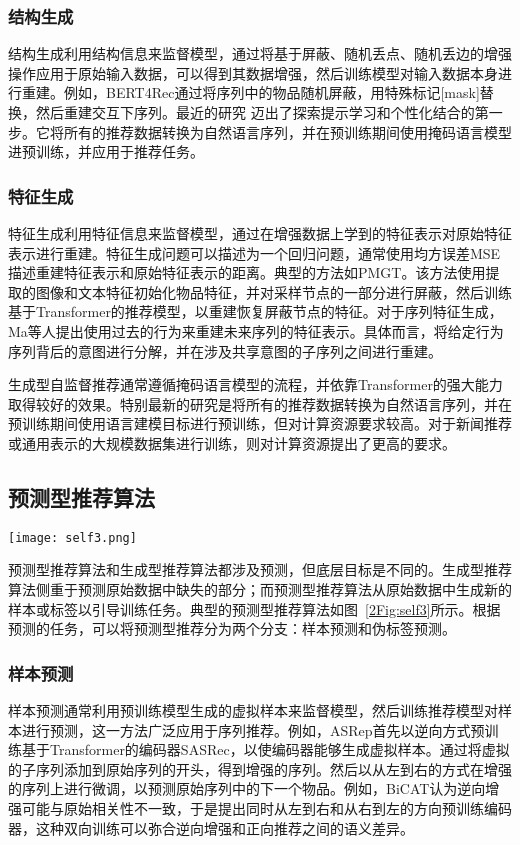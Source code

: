 \subsubsection{结构生成}
结构生成利用结构信息来监督模型，通过将基于屏蔽、随机丢点、随机丢边的增强操作应用于原始输入数据，可以得到其数据增强，然后训练模型对输入数据本身进行重建。例如，BERT4Rec\cite{sun2019bert4rec}通过将序列中的物品随机屏蔽，用特殊标记[mask]替换，然后重建交互下序列。最近的研究 \cite{geng2022recommendation,zhang:sigir} 迈出了探索提示学习和个性化结合的第一步。它将所有的推荐数据转换为自然语言序列，并在预训练期间使用掩码语言模型进预训练，并应用于推荐任务。
\subsubsection{特征生成}
特征生成利用特征信息来监督模型，通过在增强数据上学到的特征表示对原始特征表示进行重建。特征生成问题可以描述为一个回归问题，通常使用均方误差MSE描述重建特征表示和原始特征表示的距离。典型的方法如PMGT\cite{liu2021pre}。该方法使用提取的图像和文本特征初始化物品特征，并对采样节点的一部分进行屏蔽，然后训练基于Transformer的推荐模型，以重建恢复屏蔽节点的特征。对于序列特征生成，Ma等人\cite{ma2020disentangled}提出使用过去的行为来重建未来序列的特征表示。具体而言，将给定行为序列背后的意图进行分解，并在涉及共享意图的子序列之间进行重建。

生成型自监督推荐通常遵循掩码语言模型的流程，并依靠Transformer的强大能力取得较好的效果。特别最新的研究是将所有的推荐数据转换为自然语言序列，并在预训练期间使用语言建模目标进行预训练，但对计算资源要求较高。对于新闻推荐或通用表示的大规模数据集进行训练，则对计算资源提出了更高的要求。


\subsection{预测型推荐算法}
\begin{figure*}[h!]
	\centering
	\texttt{[image: self3.png]}
	\caption{典型的预测型推荐算法示意图}
	\label{2Fig:self3}
\end{figure*}
预测型推荐算法和生成型推荐算法都涉及预测，但底层目标是不同的。生成型推荐算法侧重于预测原始数据中缺失的部分；而预测型推荐算法从原始数据中生成新的样本或标签以引导训练任务。典型的预测型推荐算法如图~\ref{2Fig:self3}所示。根据预测的任务，可以将预测型推荐分为两个分支：样本预测和伪标签预测。

\subsubsection{样本预测}
样本预测通常利用预训练模型生成的虚拟样本来监督模型，然后训练推荐模型对样本进行预测，这一方法广泛应用于序列推荐。例如，ASRep\cite{liu2021augmenting}首先以逆向方式预训练基于Transformer的编码器SASRec\cite{kang2018self}，以使编码器能够生成虚拟样本。通过将虚拟的子序列添加到原始序列的开头，得到增强的序列。然后以从左到右的方式在增强的序列上进行微调，以预测原始序列中的下一个物品。例如，BiCAT\cite{jiang2021sequential}认为逆向增强可能与原始相关性不一致，于是提出同时从左到右和从右到左的方向预训练编码器，这种双向训练可以弥合逆向增强和正向推荐之间的语义差异。

